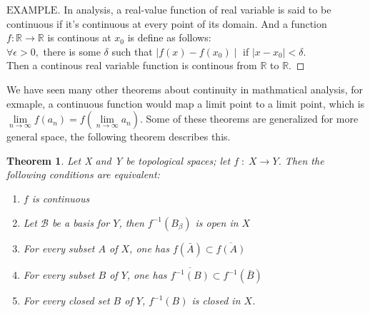\documentclass[a4paper, 11pt]{article}
\newtheorem{theorem}{Theorem}
\theoremstyle{definition}
\theoremstyle{remark}
\newenvironment{myexam}
{\renewcommand\qedsymbol{$ $}\begin{proof}[$\mathrm{EXAMPLE}$]}
  {\end{proof}}
\theoremstyle{definition}
\begin{document}
\begin{myexam}
       In analysis, a real-value function of real variable is said to be 
       continuous if it's continuous at every point of its domain. And a function
       $f:\mathbb{R}\rightarrow \mathbb{R}$ is continous at $x_0$ is define as
       follows:\\
       \indent
       $\forall \epsilon >0, $ there is some $\delta$ such that $\mid f(x)-f(x_0)
       \mid $ if $\mid x-x_0 \mid< \delta $.\\
       Then a continous real variable function is continous from $\mathbb{R}$
       to $\mathbb{R}$.
\end{myexam}

We have seen many other theorems about continuity in mathmatical analysis, for 
exmaple, a continuous function would map a limit point to a limit point, which is
$\lim\limits_{n\to \infty}f(a_n)=f(\lim\limits_{n\to \infty}a_n)$. Some of these
theorems are generalized for more general space, the following theorem describes
this.
\begin{theorem}
       Let X and Y be topological spaces; let $f\;:\;X\rightarrow Y$. Then the 
       following conditions are equivalent:
       \begin{enumerate}[label=(\arabic*)]
              \item $f$ is continuous 
              \item Let $\mathcal{B}$ be a basis for $Y$, then $f^{-1}(B_{\beta})$ is open
                      in $X$
              \item For every subset $A$ of $X$, one has $f(\bar{A})\subset 
                      \overline {f(A)}$
              \item For every subset $B$ of $Y$, one has $\overline{f^{-1}(B)}
                              \subset f^{-1}(\bar{B})$
              \item For every closed set $B$ of $Y$, $f^{-1}(B)$ is closed in $X$.
       \end{enumerate}
\end{theorem}
\vspace{0.3cm}
\end{document}
